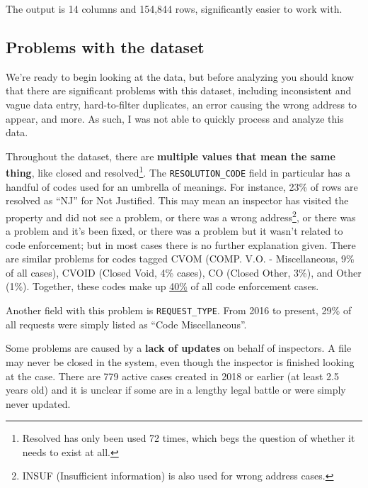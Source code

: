 \documentclass[
]{book}
\begin{document}
The output is 14 columns and 154,844 rows, significantly easier to work with.

\hypertarget{problems-with-the-dataset}{%
\subsection{Problems with the dataset}\label{problems-with-the-dataset}}

We're ready to begin looking at the data, but before analyzing you should know that there are significant problems with this dataset, including inconsistent and vague data entry, hard-to-filter duplicates, an error causing the wrong address to appear, and more. As such, I was not able to quickly process and analyze this data.

Throughout the dataset, there are \textbf{multiple values that mean the same thing}, like closed and resolved\footnote{Resolved has only been used 72 times, which begs the question of whether it needs to exist at all.}. The \texttt{RESOLUTION\_CODE} field in particular has a handful of codes used for an umbrella of meanings. For instance, 23\% of rows are resolved as ``NJ'' for Not Justified. This may mean an inspector has visited the property and did not see a problem, or there was a wrong address\footnote{INSUF (Insufficient information) is also used for wrong address cases.}, or there was a problem and it's been fixed, or there was a problem but it wasn't related to code enforcement; but in most cases there is no further explanation given. There are similar problems for codes tagged CVOM (COMP. V.O. - Miscellaneous, 9\% of all cases), CVOID (Closed Void, 4\% cases), CO (Closed Other, 3\%), and Other (1\%). Together, these codes make up \underline{40\%} of all code enforcement cases.

Another field with this problem is \texttt{REQUEST\_TYPE}. From 2016 to present, 29\% of all requests were simply listed as ``Code Miscellaneous''.

Some problems are caused by a \textbf{lack of updates} on behalf of inspectors. A file may never be closed in the system, even though the inspector is finished looking at the case. There are 779 active cases created in 2018 or earlier (at least 2.5 years old) and it is unclear if some are in a lengthy legal battle or were simply never updated.
\end{document}
